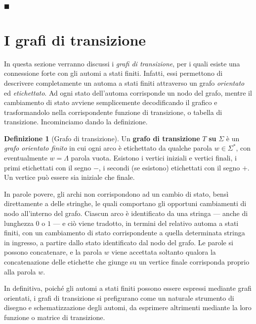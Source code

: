 \documentclass[10pt]{\classname}
\theoremstyle{definition}
\newtheorem{definizione}{Definizione}[section]
\theoremstyle{definition}
\theoremstyle{definition}
\theoremstyle{definition}
\begin{document}
\begin{flushright}
$\blacksquare$
\end{flushright}

\clearpage


\section{I grafi di transizione}

In questa sezione verranno discussi i \emph{grafi di transizione}, per i quali esiste una connessione forte con gli automi a stati finiti. Infatti, essi permettono di descrivere completamente un automa a stati finiti attraverso un grafo \emph{orientato} ed \emph{etichettato}. Ad ogni stato dell'automa corrisponde un nodo del grafo, mentre il cambiamento di stato avviene semplicemente decodificando il grafico e trasformandolo nella corrispondente funzione di transizione, o tabella di transizione. Incominciamo dando la definizione.

\begin{definizione}[Grafo di transizione]
Un \textbf{grafo di transizione} $T$ \textbf{su} $\Sigma$ è un \emph{grafo orientato finito} in cui ogni arco è etichettato da qualche parola $w \in \Sigma^*$, con eventualmente $w =\Lambda$ parola vuota. Esistono i vertici iniziali e vertici finali, i primi etichettati con il segno $-$, i secondi (se esistono) etichettati con il segno $+$. Un vertice può essere sia iniziale che finale.
\end{definizione}

In parole povere, gli archi non corrispondono ad un cambio di stato, bensì direttamente a delle stringhe, le quali comportano gli opportuni cambiamenti di nodo all'interno del grafo. Ciascun arco è identificato da una stringa --- anche di lunghezza $0$ o $1$ --- e ciò viene tradotto, in termini del relativo automa a stati finiti, con un cambiamento di stato corrispondente a quella determinata stringa in ingresso, a partire dallo stato identificato dal nodo del grafo. Le parole si possono concatenare, e la parola $w$ viene accettata soltanto qualora la concatenazione delle etichette che giunge su un vertice finale corrisponda proprio alla parola $w$.

In definitiva, poiché gli automi a stati finiti possono essere espressi mediante grafi orientati, i grafi di transizione si prefigurano come un naturale strumento di disegno e schematizzazione degli automi, da esprimere altrimenti mediante la loro funzione o matrice di transizione.
\end{document}
